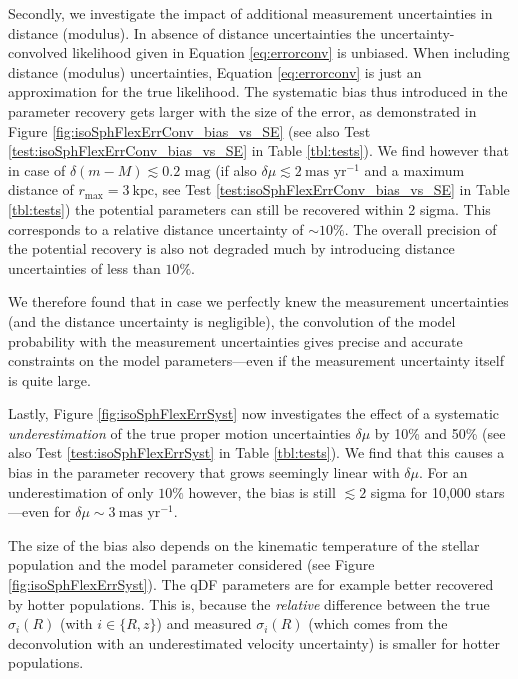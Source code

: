 Secondly, we investigate the impact of additional measurement uncertainties in distance (modulus). In absence of distance uncertainties the uncertainty-convolved likelihood given in Equation \ref{eq:errorconv} is unbiased.  When including distance (modulus) uncertainties, Equation \ref{eq:errorconv} is just an approximation for the true likelihood. The systematic bias thus introduced in the parameter recovery gets larger with the size of the error, as demonstrated in Figure \ref{fig:isoSphFlexErrConv_bias_vs_SE} (see also Test \ref{test:isoSphFlexErrConv_bias_vs_SE} in Table \ref{tbl:tests}).  We find however that in case of $\delta(m-M) \lesssim 0.2 \text{ mag}$ (if also $\delta \mu \lesssim 2 ~\text{mas yr}^{-1}$ and a maximum distance of $r_\text{max} = 3~\text{kpc}$, see Test \ref{test:isoSphFlexErrConv_bias_vs_SE} in Table \ref{tbl:tests}) the potential parameters can still be recovered within 2 sigma. This corresponds to a relative distance uncertainty of $\sim10\%$. The overall precision of the potential recovery is also not degraded much by introducing distance uncertainties of less than $10\%$.

We therefore found that in case we perfectly knew the measurement uncertainties (and the distance uncertainty is negligible), the convolution of the model probability with the measurement uncertainties gives precise and accurate constraints on the model parameters---even if the measurement uncertainty itself is quite large.

Lastly, Figure \ref{fig:isoSphFlexErrSyst} now investigates the effect of a systematic \emph{underestimation} of the true proper motion uncertainties $\delta \mu$ by 10\% and 50\% (see also Test \ref{test:isoSphFlexErrSyst} in Table \ref{tbl:tests}). We find that this causes a bias in the parameter recovery that grows seemingly linear with $\delta \mu$. For an underestimation of only $10\%$ however, the bias is still $\lesssim 2$ sigma for 10,000 stars---even for $\delta \mu \sim 3~\text{mas yr}^{-1}$.

The size of the bias also depends on the kinematic temperature of the stellar population and the model parameter considered (see Figure \ref{fig:isoSphFlexErrSyst}). The qDF parameters are for example better recovered by hotter populations. This is, because the \emph{relative} difference between the true $\sigma_i(R)$ (with $i \in \{R,z\}$) and measured $\sigma_i(R)$ (which comes from the deconvolution with an underestimated velocity uncertainty) is smaller for hotter populations. 
